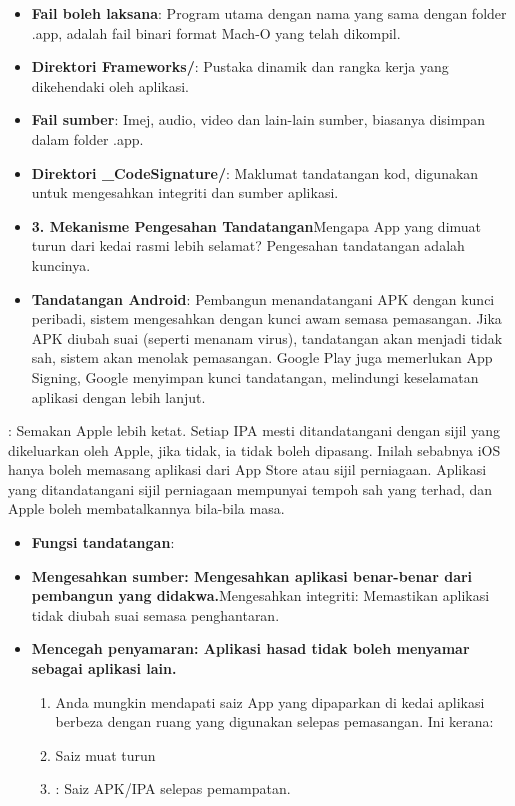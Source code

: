 \begin{itemize}
  \item \textbf{Fail boleh laksana}: Program utama dengan nama yang sama dengan folder .app, adalah fail binari format Mach-O yang telah dikompil.
  \item \textbf{Direktori Frameworks/}: Pustaka dinamik dan rangka kerja yang dikehendaki oleh aplikasi.
  \item \textbf{Fail sumber}: Imej, audio, video dan lain-lain sumber, biasanya disimpan dalam folder .app.
  \item \textbf{Direktori \_CodeSignature/}: Maklumat tandatangan kod, digunakan untuk mengesahkan integriti dan sumber aplikasi.
  \item \textbf{3. Mekanisme Pengesahan Tandatangan}Mengapa App yang dimuat turun dari kedai rasmi lebih selamat? Pengesahan tandatangan adalah kuncinya.
  \item \textbf{Tandatangan Android}: Pembangun menandatangani APK dengan kunci peribadi, sistem mengesahkan dengan kunci awam semasa pemasangan. Jika APK diubah suai (seperti menanam virus), tandatangan akan menjadi tidak sah, sistem akan menolak pemasangan. Google Play juga memerlukan App Signing, Google menyimpan kunci tandatangan, melindungi keselamatan aplikasi dengan lebih lanjut.
\end{itemize}


: Semakan Apple lebih ketat. Setiap IPA mesti ditandatangani dengan sijil yang dikeluarkan oleh Apple, jika tidak, ia tidak boleh dipasang. Inilah sebabnya iOS hanya boleh memasang aplikasi dari App Store atau sijil perniagaan. Aplikasi yang ditandatangani sijil perniagaan mempunyai tempoh sah yang terhad, dan Apple boleh membatalkannya bila-bila masa.

\begin{itemize}
  \item \textbf{Fungsi tandatangan}:
  \item \textbf{Mengesahkan sumber: Mengesahkan aplikasi benar-benar dari pembangun yang didakwa.}Mengesahkan integriti: Memastikan aplikasi tidak diubah suai semasa penghantaran.
  \item \textbf{Mencegah penyamaran: Aplikasi hasad tidak boleh menyamar sebagai aplikasi lain.}
  \begin{enumerate}
    \item Anda mungkin mendapati saiz App yang dipaparkan di kedai aplikasi berbeza dengan ruang yang digunakan selepas pemasangan. Ini kerana:
    \item Saiz muat turun
    \item : Saiz APK/IPA selepas pemampatan.
  \end{enumerate}
\end{itemize}

